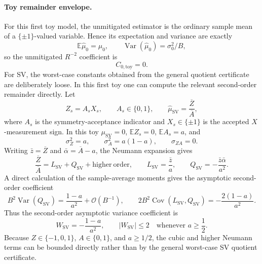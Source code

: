 \documentclass[11pt]{article}
\newcommand{\Var}{\operatorname{Var}}
\newcommand{\Cov}{\operatorname{Cov}}
\newcommand{\E}{\mathbb{E}}
\newcommand{\1}{\mathbf{1}}
\newcommand{\OO}{\mathcal{O}}
\begin{document}
\paragraph{Toy remainder envelope.}
For this first toy model, the unmitigated estimator is the ordinary sample mean of a \(\{\pm1\}\)-valued variable.  Hence its expectation and variance are exactly
\begin{equation}
    \E\widehat\mu_0=\mu_0,
    \qquad
    \Var(\widehat\mu_0)=\sigma_0^2/B,
\end{equation}
so the unmitigated \(R^{-2}\) coefficient is
\begin{equation}
    C_{0,\mathrm{toy}}=0.
\end{equation}
For SV, the worst-case constants obtained from the general quotient certificate are deliberately loose.  In this first toy one can compute the relevant second-order remainder directly.  Let
\begin{equation}
    Z_s=A_s X_s,
    \qquad
    A_s\in\{0,1\},
    \qquad
    \widehat\mu_{\mathrm{SV}}=\frac{\overline Z}{\overline A},
\end{equation}
where \(A_s\) is the symmetry-acceptance indicator and \(X_s\in\{\pm1\}\) is the accepted \(X\)-measurement sign.  In this toy \(\mu_{\mathrm{SV}}=0\), \(\E Z_s=0\), \(\E A_s=a\), and
\begin{equation}
    \sigma_Z^2=a,
    \qquad
    \sigma_A^2=a(1-a),
    \qquad
    \sigma_{ZA}=0.
\end{equation}
Writing \(\bar z=\overline Z\) and \(\bar\alpha=\overline A-a\), the Neumann expansion gives
\begin{equation}
    \frac{\overline Z}{\overline A}
    =L_{\mathrm{SV}}+Q_{\mathrm{SV}}+\mathrm{higher\ order},
    \qquad
    L_{\mathrm{SV}}=\frac{\bar z}{a},
    \qquad
    Q_{\mathrm{SV}}=-\frac{\bar z\bar\alpha}{a^2}.
\end{equation}
A direct calculation of the sample-average moments gives the asymptotic second-order coefficient
\begin{equation}
    B^2\Var(Q_{\mathrm{SV}})=\frac{1-a}{a^2}+\OO(B^{-1}),
    \qquad
    2B^2\Cov(L_{\mathrm{SV}},Q_{\mathrm{SV}})=-\frac{2(1-a)}{a^2}.
    \label{eq:toy_sv_second_order_exact_final}
\end{equation}
Thus the second-order asymptotic variance coefficient is
\begin{equation}
    W_{\mathrm{SV}}=-\frac{1-a}{a^2},
    \qquad
    |W_{\mathrm{SV}}|\le2
    \quad\text{whenever }a\ge\frac12.
    \label{eq:toy_sv_W_bound_final}
\end{equation}
Because \(Z\in\{-1,0,1\}\), \(A\in\{0,1\}\), and \(a\ge1/2\), the cubic and higher Neumann terms can be bounded directly rather than by the general worst-case SV quotient certificate.
\end{document}
